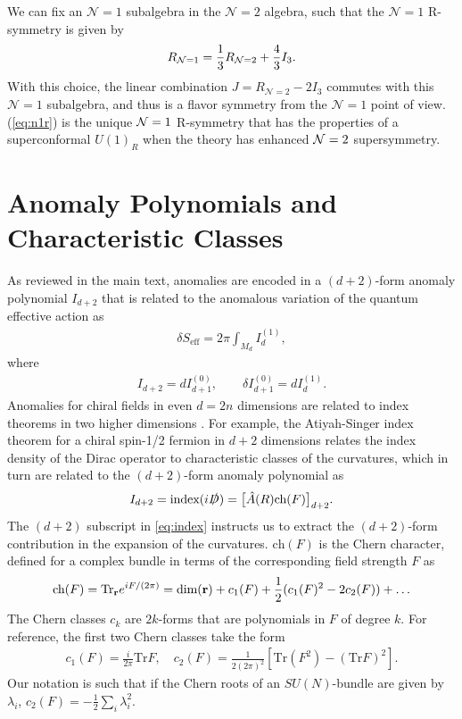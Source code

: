 \documentclass[a4paper,11pt]{article}
\newcommand{\ba}[1]{\begin{align} #1 \end{align} }
\def\tr{\text{Tr}}
\def\CN{{\cal N}}
\newcommand{\mc}[1]{\mathcal{ #1} }
\begin{document}
We can fix an $\mc{N}=1$ subalgebra in the $\mc{N}=2$ algebra, such that the $\mc{N}=1$ R-symmetry is given by
	\ba{
	R_{\CN=1} = \frac{1}{3} R_{\CN=2} + \frac{4}{3} I_3.\label{eq:n1r}
	} 
With this choice, the linear combination
	$J=R_{\mc{N}=2} - 2I_3$
commutes with this $\mc{N}=1$ subalgebra, and thus is a flavor symmetry from the $\mc{N}=1$ point of view. (\ref{eq:n1r}) is the unique $\CN=1$ R-symmetry that has the properties of a superconformal $U(1)_R$ when the theory has enhanced $\CN=2$ supersymmetry.




\section{Anomaly Polynomials and Characteristic Classes} \label{sec:anomalypolynomials}

As reviewed in the main text, anomalies are encoded in a $(d+2)$-form anomaly polynomial $I_{d+2}$ that is related to the anomalous variation of the quantum effective action as
	\ba{
	\delta {S}_{\text{eff}} = 2\pi \int_{M_d} I_{d}^{(1)},
	}
where 
	\ba{
	I_{d+2}=dI_{d+1}^{(0)},\qquad \delta I_{d+1}^{(0)} = dI_{d}^{(1)}.
	}
Anomalies for chiral fields in even $d=2n$ dimensions are related to index theorems in two higher dimensions \cite{AlvarezGaume:1983ig}. For example, the Atiyah-Singer index theorem for a chiral spin-1/2 fermion in $d+2$ dimensions relates the index density of the Dirac operator to characteristic classes of the curvatures, which in turn are related to the $(d+2)$-form anomaly polynomial as
	\ba{
	I_{d+2} = \text{index}(i \slashed{D})=\big[ \hat{A}(R)\text{ch}(F)\big]_{d+2}. \label{eq:index}
	}
The $(d+2)$ subscript in \eqref{eq:index} instructs us to extract the $(d+2)$-form contribution in the expansion of the curvatures. $\text{ch}(F)$ is the Chern character, defined for a complex bundle in terms of the corresponding field strength $F$ as
	\ba{
	\text{ch}(F)=\tr_{\bf r} e^{iF/(2\pi)}= \text{dim}({\bf r}) + c_1(F) + \frac{1}{2}(c_1(F)^2 - 2c_2(F)) + \dots \label{eq:chernclass}
	}
The Chern classes $c_k$ are $2k$-forms that are polynomials in $F$ of degree $k$. For reference, the first two Chern classes take the form 
	\ba{
	c_1(F) =\frac{i}{2\pi}\text{Tr} F,\quad c_2(F) = \frac{1}{2(2\pi)^2} \left[\text{Tr}(F^2)-(\text{Tr}F)^2\right]. 
	}
Our notation is such that if the Chern roots of an $SU(N)$-bundle are given by $\lambda_i$, $c_2(F)=-\frac{1}{2}\sum_i \lambda_i^2$.
\end{document}
